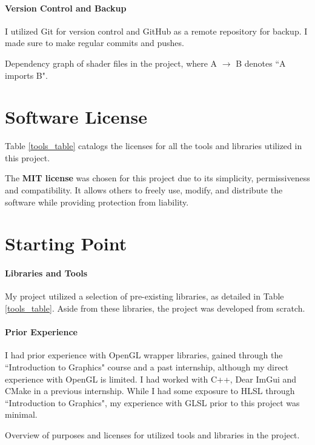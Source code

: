 \paragraph{Version Control and Backup}
I utilized Git for version control and GitHub as a remote repository for backup. I made sure to make regular commits and pushes.

{Dependency graph of shader files in the project, where A $\rightarrow$ B denotes ``A imports B".}

\section{Software License}
\label{sec:License}

Table \ref{tools_table} catalogs the licenses for all the tools and libraries utilized in this project.

The \textbf{MIT license} was chosen for this project due to its simplicity, permissiveness and compatibility. It allows others to freely use, modify, and distribute the software while providing protection from liability.


\section{Starting Point}
\label{sec:Starting Point}

\paragraph{Libraries and Tools}
My project utilized a selection of pre-existing libraries, as detailed in Table \ref{tools_table}. Aside from these libraries, the project was developed from scratch. 

\paragraph{Prior Experience}
I had prior experience with OpenGL wrapper libraries, gained through the ``Introduction to Graphics" course and a past internship, although my direct experience with OpenGL is limited. I had worked with C++, Dear ImGui and CMake in a previous internship. While I had some exposure to HLSL through ``Introduction to Graphics", my experience with GLSL prior to this project was minimal.

{Overview of purposes and licenses for utilized tools and libraries in the project.}
